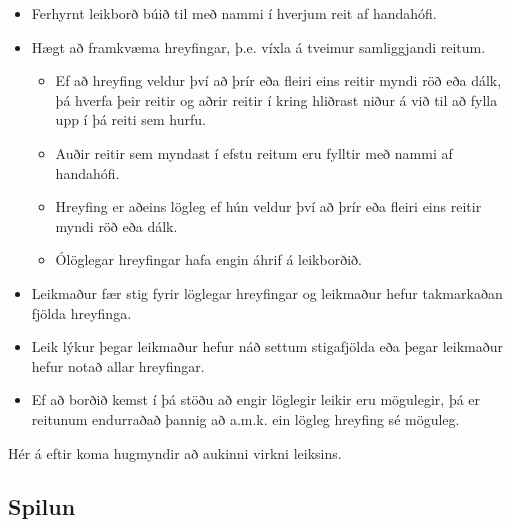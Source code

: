 \documentclass[11pt,a4paper,oneside]{article}
\begin{document}
	\begin{itemize}
		\item Ferhyrnt leikborð búið til með nammi í hverjum reit af handahófi.
		\item Hægt að framkvæma hreyfingar, þ.e. víxla á tveimur samliggjandi reitum.
			\begin{itemize}
				\item Ef að hreyfing veldur því að þrír eða fleiri eins reitir myndi röð eða dálk, þá hverfa þeir reitir og aðrir reitir í kring hliðrast niður á við til að fylla upp í þá reiti sem hurfu.
				\item Auðir reitir sem myndast í efstu reitum eru fylltir með nammi af handahófi.
				\item Hreyfing er aðeins lögleg ef hún veldur því að þrír eða fleiri eins reitir myndi röð eða dálk.
				\item Ólöglegar hreyfingar hafa engin áhrif á leikborðið.
			\end{itemize}
		\item Leikmaður fær stig fyrir löglegar hreyfingar og leikmaður hefur takmarkaðan fjölda hreyfinga.
		\item Leik lýkur þegar leikmaður hefur náð settum stigafjölda eða þegar leikmaður hefur notað allar hreyfingar.
		\item Ef að borðið kemst í þá stöðu að engir löglegir leikir eru mögulegir, þá er reitunum endurraðað þannig að a.m.k. ein lögleg hreyfing sé möguleg.
	\end{itemize}

	Hér á eftir koma hugmyndir að aukinni virkni leiksins.

	\subsection*{Spilun}
\end{document}
